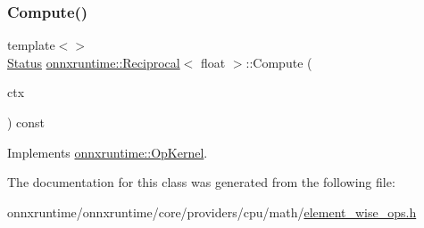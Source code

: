 \subsubsection{\texorpdfstring{Compute()}{Compute()}\hspace{0.1cm}{\footnotesize\ttfamily [2/2]}}
{\footnotesize\ttfamily template$<$$>$ \\
\mbox{\hyperlink{classonnxruntime_1_1common_1_1Status}{Status}} \mbox{\hyperlink{classonnxruntime_1_1Reciprocal}{onnxruntime\+::\+Reciprocal}}$<$ float $>$\+::Compute (\begin{DoxyParamCaption}\item[{\mbox{\hyperlink{classonnxruntime_1_1OpKernelContext}{Op\+Kernel\+Context}} $\ast$}]{ctx }\end{DoxyParamCaption}) const\hspace{0.3cm}{\ttfamily [virtual]}}



Implements \mbox{\hyperlink{classonnxruntime_1_1OpKernel_a9eca8656a78b1b3ab9d3351a12798650}{onnxruntime\+::\+Op\+Kernel}}.



The documentation for this class was generated from the following file\+:\begin{DoxyCompactItemize}
\item 
onnxruntime/onnxruntime/core/providers/cpu/math/\mbox{\hyperlink{element__wise__ops_8h}{element\+\_\+wise\+\_\+ops.\+h}}\end{DoxyCompactItemize}
